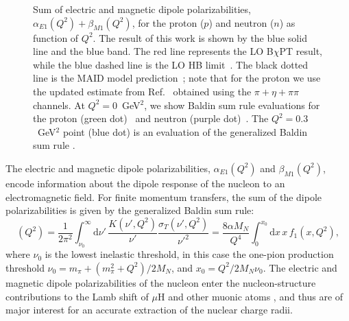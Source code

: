 \documentclass[11pt,preprint,tightenlines,
showpacs,preprintnumbers,amsmath,amssymb,superscriptaddress,a4paper,nofootinbib]{revtex4-1}
\def\beq{\begin{equation}}
\def\eeq{\end{equation}}
\def\al{\alpha}
\def\dd{\mathrm{d}}
\begin{document}
\begin{figure}[hbt]
\begin{center}
 \hspace{0.5cm}
\caption{Sum of electric and magnetic dipole polarizabilities, $\alpha_{E1}(Q^2)+\beta_{M1}(Q^2)$, for the proton ($p$) and neutron ($n$) as function of $Q^2$.  
The result of this work is shown by the blue solid line and the blue band.
The red line represents the LO B$\chi$PT result, while the blue dashed line is the LO HB limit~\cite{Nevado:2007dd}.
The black dotted line is the MAID model prediction~\cite{Drechsel:2000ct,Drechsel:1998hk,private-Lothar}; note that for the proton we use the updated estimate from Ref.~\cite{Drechsel:2002ar} obtained using the $\pi+\eta+\pi\pi$ channels.
At $Q^2=0$~GeV$^2$, we show Baldin sum rule evaluations for the proton (green dot)~\cite{Gryniuk:2015aa} and neutron (purple dot)~\cite{Babusci:1997ij}.
 The $Q^2=0.3$~GeV$^2$ point (blue dot) is an evaluation of the generalized Baldin sum rule \cite{Liang:2004tk}.
 \label{Fig:alpha+betaplot}}
\end{center}
\end{figure}


The electric and magnetic dipole polarizabilities, $\alpha_{E1}(Q^2)$ and $\beta_{M1}(Q^2)$, encode information about the dipole response of the nucleon to an electromagnetic field. For finite momentum transfers, the sum of the dipole polarizabilities is given by the generalized Baldin sum rule:
\beq
[\alpha_{E1}+\beta_{M1}] (Q^2)= \frac{1}{2 \pi^2} \int_{\nu_0}^\infty \! \dd\nu'\,\frac{K(\nu',Q^2)}{\nu'} \frac{\sigma_T (\nu',Q^2)}{\nu'^2} =\frac{8 \al M_N}{Q^4}\int_0^{x_0}\!\dd x\, x \,f_1(x,Q^2),\label{Eq:alpha+betaQ2}
\eeq
where $\nu_0$ is the lowest inelastic threshold, in this case the one-pion production threshold $\nu_0=m_\pi + (m_\pi^2+Q^2)/2M_N$, and $x_0=Q^2/2M_N \nu_0$.
The electric and magnetic dipole polarizabilities of the nucleon enter the nucleon-structure contributions
to the Lamb shift of $\mu$H and other muonic atoms \cite{Bernabeu:1982qy,Pachucki:1996zza,Carlson:2011zd,Alarcon:2013cba}, and thus
are of major interest for an accurate extraction of the nuclear charge radii.
\end{document}

